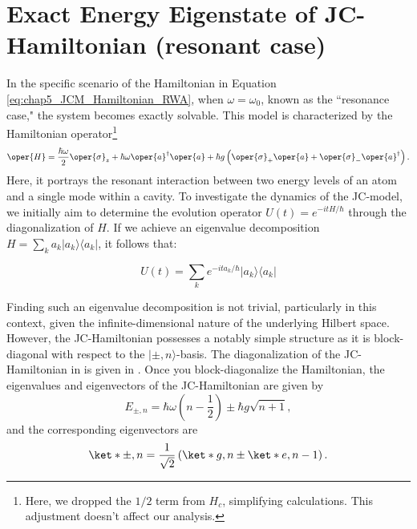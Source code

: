 \section[Exact Energy Eigenstate of JC-Hamiltonian]{Exact Energy Eigenstate of JC-Hamiltonian (resonant case)}

In the specific scenario of the Hamiltonian in Equation \ref{eq:chap5_JCM_Hamiltonian_RWA}, when 
\(\omega  = \omega_0\), known as the 
``resonance case," the system becomes exactly solvable.
This model is characterized by the Hamiltonian operator\footnote{Here, we dropped the \(1/2\) term from \(H_c\), 
simplifying calculations. This adjustment doesn't affect our analysis.}
\begin{equation}
        \label{eq:chap5_JCM_Hamiltonian_resonance}
        \oper{H} = \frac{\hbar\omega}{2} \oper{\sigma}_z + \hbar \omega \oper{a}^\dagger \oper{a}
        + \hbar g \left(\oper{\sigma}_+ \oper{a} + \oper{\sigma}_- \oper{a}^\dagger\right). 
\end{equation}
Here, it portrays the resonant interaction between two energy levels of an atom and a single mode within a cavity.
To investigate the dynamics of the JC-model, we initially aim to determine the evolution operator 
$U(t) = e^{-i t H/\hbar}$ through the diagonalization of $H$. If we achieve an eigenvalue decomposition 
$H = \sum_k a_k \lvert a_k \rangle \langle a_k \rvert$, it follows that:

\begin{equation}
U(t) = \sum_k e^{-i t a_k/\hbar} \lvert a_k \rangle \langle a_k \rvert
\end{equation}

Finding such an eigenvalue decomposition is not trivial, particularly in this context, 
given the infinite-dimensional nature of the underlying Hilbert space. However, the 
JC-Hamiltonian possesses a notably simple structure as it is block-diagonal with respect 
to the $\lvert \pm, n \rangle$-basis. The diagonalization of the JC-Hamiltonian in 
 is given in .
Once you block-diagonalize the Hamiltonian, the eigenvalues and eigenvectors of the JC-Hamiltonian are given by
\begin{equation}
        \label{eq:chap5_JCM_eigenvalues}
        E_{\pm, n} = \hbar \omega \left(n - \frac{1}{2}\right) \pm \hbar g \sqrt{n + 1},
\end{equation}
and the corresponding eigenvectors are
\begin{equation}
        \label{eq:chap5_JCM_eigenvectors}
        \ket*{\pm, n} = \frac{1}{\sqrt{2}} \left(\ket*{g, n} \pm \ket*{e, n-1}\right).
\end{equation}
